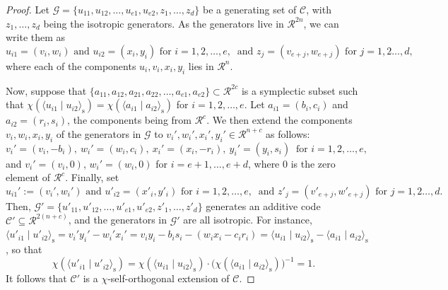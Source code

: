 \documentclass{article}
\theoremstyle{remark}
\theoremstyle{definition}
\numberwithin{equation}{section}
\begin{document}
 \begin{proof} Let $\mathcal{G} = \{u_{11},u_{12},\ldots,u_{e1},u_{e2},z_1,\ldots,z_d\}$ be a generating set of $\mathcal{C}$, with $z_1,\ldots,z_d$ being the isotropic generators. As the generators live in $\mathcal{R}^{2n}$, we can write them as
 $$
 u_{i1} = (v_i,w_i) \text{ and }  u_{i2} = (x_i,y_i) \text{ for } i = 1,2,\ldots,e,\ \text{ and }  z_j = (v_{e+j},w_{e+j}) \text{ for } j=1,2\ldots,d,
 $$
 where each of the components $u_i,v_i,x_i,y_i$ lies in $\mathcal{R}^n$. 
 
 Now, suppose that $\{a_{11},a_{12},a_{21},a_{22},\ldots,a_{e1},a_{e2}\} \subset \mathcal{R}^{2c}$ is a symplectic subset such that $\chi(\langle u_{i1} \mid u_{i2} \rangle_{\text{s}}) = \chi(\langle a_{i1} \mid a_{i2} \rangle_{\text{s}})$ for $i=1,2,\ldots,e$. Let $a_{i1} = (b_i,c_i)$ and $a_{i2} = (r_i,s_i)$, the components being from $\mathcal{R}^c$. We then extend the components $v_i,w_i,x_i,y_i$ of the generators in $\mathcal{G}$ to $v_i',w_i',x_i',y_i' \in \mathcal{R}^{n+c}$ as follows:
 $$
 v_i' = (v_i,-b_i), \ w_i' = (w_i,c_i), \ x_i' = (x_i,-r_i),\ y_i' = (y_i,s_i) \ \text{ for } i = 1,2,\ldots,e,
 $$
 and $v_i' = (v_i,0)$, $w_i' = (w_i,0)$ for $i = e+1,\ldots,e+d$, where $0$ is the zero element of $\mathcal{R}^c$. Finally, set 
 $$
 u_{i1}' := (v_i',w_i') \text{ and }  u'_{i2} = (x'_i,y'_i) \text{ for } i = 1,2,\ldots,e,\ \text{ and }  z'_j = (v'_{e+j},w'_{e+j}) \text{ for } j=1,2\ldots,d.
 $$
 Then, $\mathcal{G}' = \{u'_{11},u'_{12},\ldots,u'_{e1},u'_{e2},z'_1,\ldots,z'_d\}$ generates an additive code $\mathcal{C}' \subseteq \mathcal{R}^{2(n+c)}$, and the generators in $\mathcal{G}'$ are all isotropic. For instance, $\langle u'_{i1} \mid u'_{i2}\rangle_{\text{s}} = v_i'y_i'-w_i'x_i' = v_iy_i - b_is_i - (w_ix_i-c_ir_i) = \langle u_{i1} \mid u_{i2}\rangle_{\text{s}} - \langle a_{i1} \mid a_{i2}\rangle_{\text{s}}$, so that 
 $$
 \chi(\langle u'_{i1} \mid u'_{i2}\rangle_{\text{s}}) = \chi(\langle u_{i1} \mid u_{i2}\rangle_{\text{s}}) \cdot \bigl(\chi(\langle a_{i1} \mid a_{i2}\rangle_{\text{s}})\bigr)^{-1} = 1.
 $$
It follows that $\mathcal{C}'$ is a $\chi$-self-orthogonal extension of $\mathcal{C}$.


\end{proof}
\end{document}
